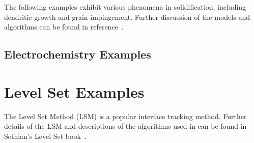 \documentclass[letterpaper,twoside,openright,10pt]{memoir}
\begin{document}
The following examples exhibit various phenomena in solidification, including
dendritic growth and grain impingement.  Further discussion of the
models and algorithms can be found in
reference~\cite{WarrenPolycrystal}.





% 

\label{sec:impingement}
% 
% 
% 
% 
\newpage

\section*{Electrochemistry Examples}






% 





\chapter{Level Set Examples}

The Level Set Method (LSM) is a popular interface tracking
method. Further details of the LSM and descriptions of the algorithms
used in \FiPy{} can be found in Sethian's Level Set
book~\cite{levelSetBook}.


% 

% 


\end{document}
